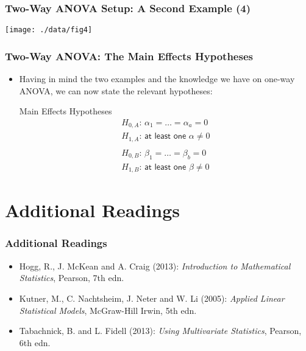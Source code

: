 \documentclass[10pt]{beamer}
\theoremstyle{definition}
\begin{document}
\begin{frame}[fragile]
\frametitle{Two-Way ANOVA Setup: A Second Example (4)}
\centerline{\texttt{[image: ./data/fig4]}}
\end{frame}

\begin{frame}[fragile]
\frametitle{Two-Way ANOVA: The Main Effects Hypotheses}
\begin{itemize}
	\item Having in mind the two examples and the knowledge we have on one-way ANOVA, we can now state the relevant hypotheses:
	\begin{block}{Main Effects Hypotheses}
		\[
			\begin{array}{lcl}
				H_{0,A}: \, \alpha_{1} = \ldots = \alpha_{a} = 0\\
				H_{1,A}: \, \textsf{at least one } \alpha \neq 0\\
				\quad\\
				H_{0,B}: \, \beta_{1} = \ldots = \beta_{b} = 0\\
				H_{1,B}: \, \textsf{at least one } \beta \neq 0
			\end{array}
		\]
	\end{block}
\end{itemize}
\end{frame}



\section{Additional Readings}
\begin{frame}[fragile]
\frametitle{Additional Readings}
\begin{itemize}
	\item Hogg, R., J. McKean and A. Craig (2013): \emph{Introduction to Mathematical Statistics}, Pearson, 7th edn.
	\item Kutner, M., C. Nachtsheim, J. Neter and W. Li (2005): \emph{Applied Linear Statistical Models}, McGraw-Hill Irwin, 5th edn.
	\item Tabachnick, B. and L. Fidell (2013): \emph{Using Multivariate Statistics}, Pearson, 6th edn.
\end{itemize}
\end{frame}
\end{document}
